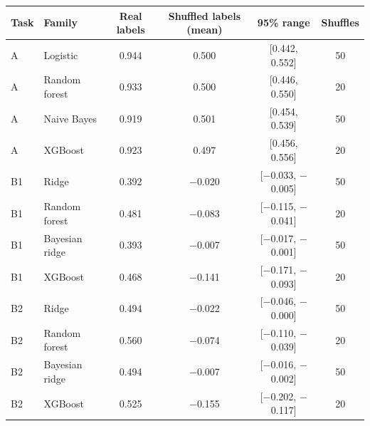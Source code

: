 \begin{tabular}{llcccc}
\toprule
Task & Family & Real labels & Shuffled labels (mean) & 95\% range & Shuffles \\
\midrule
A & Logistic & 0.944 & 0.500 & [0.442, 0.552] & 50 \\
A & Random forest & 0.933 & 0.500 & [0.446, 0.550] & 20 \\
A & Naive Bayes & 0.919 & 0.501 & [0.454, 0.539] & 50 \\
A & XGBoost & 0.923 & 0.497 & [0.456, 0.556] & 20 \\
B1 & Ridge & 0.392 & $-$0.020 & [$-$0.033, $-$0.005] & 50 \\
B1 & Random forest & 0.481 & $-$0.083 & [$-$0.115, $-$0.041] & 20 \\
B1 & Bayesian ridge & 0.393 & $-$0.007 & [$-$0.017, $-$0.001] & 50 \\
B1 & XGBoost & 0.468 & $-$0.141 & [$-$0.171, $-$0.093] & 20 \\
B2 & Ridge & 0.494 & $-$0.022 & [$-$0.046, $-$0.000] & 50 \\
B2 & Random forest & 0.560 & $-$0.074 & [$-$0.110, $-$0.039] & 20 \\
B2 & Bayesian ridge & 0.494 & $-$0.007 & [$-$0.016, $-$0.002] & 50 \\
B2 & XGBoost & 0.525 & $-$0.155 & [$-$0.202, $-$0.117] & 20 \\
\bottomrule
\end{tabular}